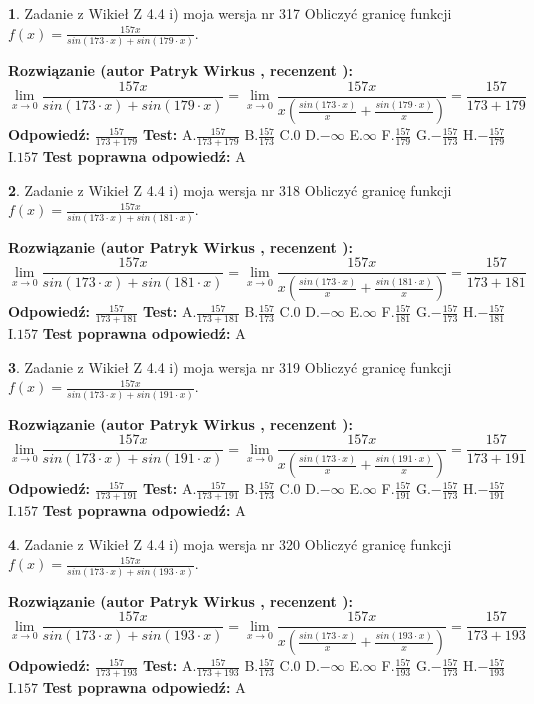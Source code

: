 \documentclass[12pt, a4paper]{article}
\theoremstyle{definition} %
\newtheorem{zad}{}
\newcommand{\zadStart}[1]{\begin{zad}#1\newline}
\newcommand{\zadStop}{\end{zad}}
\newcommand{\rozwStart}[2]{\noindent \textbf{Rozwiązanie (autor #1 , recenzent #2): }\newline}
\newcommand{\rozwStop}{\newline}
\newcommand{\odpStart}{\noindent \textbf{Odpowiedź:}\newline}
\newcommand{\odpStop}{\newline}
\newcommand{\testStart}{\noindent \textbf{Test:}\newline}
\newcommand{\testStop}{\newline}
\newcommand{\kluczStart}{\noindent \textbf{Test poprawna odpowiedź:}\newline}
\newcommand{\kluczStop}{\newline}
\begin{document}
\zadStart{Zadanie z Wikieł Z 4.4 i) moja wersja nr 317}
Obliczyć granicę funkcji $f(x)=\frac{157x}{sin(173\cdot x) +sin(179\cdot x)}$.
\zadStop
\rozwStart{Patryk Wirkus}{}
$$\lim\limits_{x\to 0}\frac{157x}{sin(173\cdot x) +sin(179\cdot x)}=\lim\limits_{x\to 0}\frac{157x}{x(\frac{sin(173\cdot x)}{x}+\frac{sin(179\cdot x)}{x})}=\frac{157}{173+179}$$
\rozwStop
\odpStart
$\frac{157}{173+179}$
\odpStop
\testStart
A.$\frac{157}{173+179}$
B.$\frac{157}{173}$
C.$0$
D.$-\infty$
E.$\infty$
F.$\frac{157}{179}$
G.$-\frac{157}{173}$
H.$-\frac{157}{179}$
I.$157$
\testStop
\kluczStart
A
\kluczStop



\zadStart{Zadanie z Wikieł Z 4.4 i) moja wersja nr 318}
Obliczyć granicę funkcji $f(x)=\frac{157x}{sin(173\cdot x) +sin(181\cdot x)}$.
\zadStop
\rozwStart{Patryk Wirkus}{}
$$\lim\limits_{x\to 0}\frac{157x}{sin(173\cdot x) +sin(181\cdot x)}=\lim\limits_{x\to 0}\frac{157x}{x(\frac{sin(173\cdot x)}{x}+\frac{sin(181\cdot x)}{x})}=\frac{157}{173+181}$$
\rozwStop
\odpStart
$\frac{157}{173+181}$
\odpStop
\testStart
A.$\frac{157}{173+181}$
B.$\frac{157}{173}$
C.$0$
D.$-\infty$
E.$\infty$
F.$\frac{157}{181}$
G.$-\frac{157}{173}$
H.$-\frac{157}{181}$
I.$157$
\testStop
\kluczStart
A
\kluczStop



\zadStart{Zadanie z Wikieł Z 4.4 i) moja wersja nr 319}
Obliczyć granicę funkcji $f(x)=\frac{157x}{sin(173\cdot x) +sin(191\cdot x)}$.
\zadStop
\rozwStart{Patryk Wirkus}{}
$$\lim\limits_{x\to 0}\frac{157x}{sin(173\cdot x) +sin(191\cdot x)}=\lim\limits_{x\to 0}\frac{157x}{x(\frac{sin(173\cdot x)}{x}+\frac{sin(191\cdot x)}{x})}=\frac{157}{173+191}$$
\rozwStop
\odpStart
$\frac{157}{173+191}$
\odpStop
\testStart
A.$\frac{157}{173+191}$
B.$\frac{157}{173}$
C.$0$
D.$-\infty$
E.$\infty$
F.$\frac{157}{191}$
G.$-\frac{157}{173}$
H.$-\frac{157}{191}$
I.$157$
\testStop
\kluczStart
A
\kluczStop



\zadStart{Zadanie z Wikieł Z 4.4 i) moja wersja nr 320}
Obliczyć granicę funkcji $f(x)=\frac{157x}{sin(173\cdot x) +sin(193\cdot x)}$.
\zadStop
\rozwStart{Patryk Wirkus}{}
$$\lim\limits_{x\to 0}\frac{157x}{sin(173\cdot x) +sin(193\cdot x)}=\lim\limits_{x\to 0}\frac{157x}{x(\frac{sin(173\cdot x)}{x}+\frac{sin(193\cdot x)}{x})}=\frac{157}{173+193}$$
\rozwStop
\odpStart
$\frac{157}{173+193}$
\odpStop
\testStart
A.$\frac{157}{173+193}$
B.$\frac{157}{173}$
C.$0$
D.$-\infty$
E.$\infty$
F.$\frac{157}{193}$
G.$-\frac{157}{173}$
H.$-\frac{157}{193}$
I.$157$
\testStop
\kluczStart
A
\kluczStop
\end{document}
